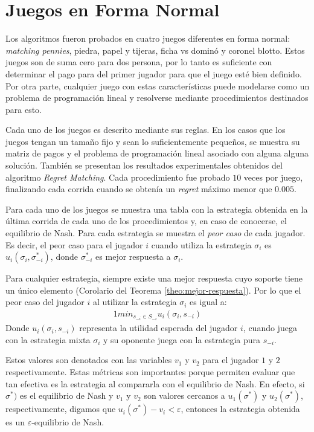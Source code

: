 \section{Juegos en Forma Normal}

Los algoritmos fueron probados en cuatro juegos diferentes en forma normal: \textit{matching pennies}, piedra, papel y tijeras, ficha vs dominó y coronel blotto. Estos juegos son de suma cero para dos persona, por lo tanto es suficiente con determinar el pago para del primer jugador para que el juego esté bien definido. Por otra parte, cualquier juego con estas características puede modelarse como un problema de programación lineal y resolverse mediante procedimientos destinados para esto.

Cada uno de los juegos es descrito mediante sus reglas. En los casos que los juegos tengan un tamaño fijo y sean lo suficientemente pequeños, se muestra su matriz de pagos y el problema de programación lineal asociado con alguna alguna solución. También se presentan los resultados experimentales obtenidos del algoritmo \textit{Regret Matching}. Cada procedimiento fue probado $10$ veces por juego, finalizando cada corrida cuando se obtenía un \textit{regret} máximo menor que $0.005$. 

Para cada uno de los juegos se muestra una tabla con la estrategia obtenida en la última corrida de cada uno de los procedimientos y, en caso de conocerse, el equilibrio de Nash. Para cada estrategia se muestra el \textit{peor caso} de cada jugador. Es decir, el peor caso para el jugador $i$ cuando utiliza la estrategia $\sigma_{i}$ es $u_i(\sigma_i, \sigma^*_{-i})$, donde $\sigma^*_{-i}$ es mejor respuesta a $\sigma_i$.

Para cualquier estrategia, siempre existe una mejor respuesta cuyo soporte tiene un único elemento (Corolario del Teorema \ref{theo:mejor-respuesta}). Por lo que el peor caso del jugador $i$ al utilizar la estrategia $\sigma_i$ es igual a:
\begin{alignat}{1}
min_{s_{-i} \in S_{-i}} u_i(\sigma_i, s_{-i})
\end{alignat}
Donde $u_i(\sigma_i, s_{-i})$ representa la utilidad esperada del jugador $i$, cuando juega con la estrategia mixta $\sigma_i$ y su oponente juega con la estrategia pura $s_{-i}$.

Estos valores son denotados con las variables $v_1$ y $v_2$ para el jugador $1$ y $2$ respectivamente. Estas métricas son importantes porque permiten evaluar que tan efectiva es la estrategia al compararla con el equilibrio de Nash. En efecto, si $\sigma^*)$ es el equilibrio de Nash y $v_1$ y $v_2$ son valores cercanos a $u_1(\sigma^*)$ y $u_2(\sigma^*)$, respectivamente, digamos que $u_i(\sigma^*) - v_i < \varepsilon$, entonces la estrategia obtenida es un $\varepsilon$-equilibrio de Nash.

